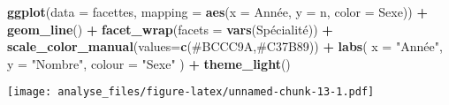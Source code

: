 \documentclass[
]{article}
\newenvironment{Shaded}{\begin{snugshade}}{\end{snugshade}}
\newcommand{\DataTypeTok}[1]{\textcolor[rgb]{0.13,0.29,0.53}{#1}}
\newcommand{\KeywordTok}[1]{\textcolor[rgb]{0.13,0.29,0.53}{\textbf{#1}}}
\newcommand{\NormalTok}[1]{#1}
\newcommand{\OperatorTok}[1]{\textcolor[rgb]{0.81,0.36,0.00}{\textbf{#1}}}
\newcommand{\StringTok}[1]{\textcolor[rgb]{0.31,0.60,0.02}{#1}}
\begin{document}
\begin{Shaded}
\begin{Highlighting}[]
\KeywordTok{ggplot}\NormalTok{(}\DataTypeTok{data =}\NormalTok{ facettes, }\DataTypeTok{mapping =} \KeywordTok{aes}\NormalTok{(}\DataTypeTok{x =}\NormalTok{ Année, }\DataTypeTok{y =}\NormalTok{ n, }\DataTypeTok{color =}\NormalTok{ Sexe)) }\OperatorTok{+}
\StringTok{  }\KeywordTok{geom\_line}\NormalTok{() }\OperatorTok{+}
\StringTok{  }\KeywordTok{facet\_wrap}\NormalTok{(}\DataTypeTok{facets =}  \KeywordTok{vars}\NormalTok{(Spécialité)) }\OperatorTok{+}
\StringTok{  }\KeywordTok{scale\_color\_manual}\NormalTok{(}\DataTypeTok{values=}\KeywordTok{c}\NormalTok{(}\StringTok{\textquotesingle{}\#BCCC9A\textquotesingle{}}\NormalTok{,}\StringTok{\textquotesingle{}\#C37B89\textquotesingle{}}\NormalTok{)) }\OperatorTok{+}
\StringTok{  }\KeywordTok{labs}\NormalTok{(}
          \DataTypeTok{x =} \StringTok{"Année"}\NormalTok{,}
          \DataTypeTok{y =} \StringTok{"Nombre"}\NormalTok{,}
          \DataTypeTok{colour =} \StringTok{"Sexe"}
\NormalTok{        ) }\OperatorTok{+}
\StringTok{  }\KeywordTok{theme\_light}\NormalTok{()}
\end{Highlighting}
\end{Shaded}

\texttt{[image: analyse\_files/figure-latex/unnamed-chunk-13-1.pdf]}
\end{document}
